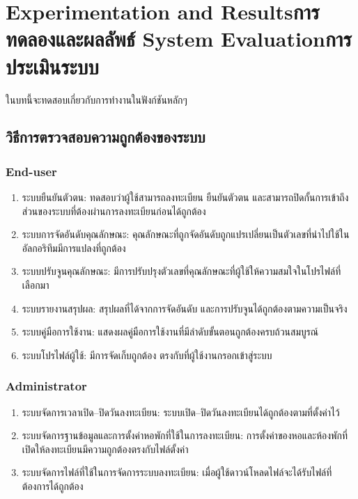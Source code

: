 \chapter{\ifproject%
\ifenglish Experimentation and Results\else การทดลองและผลลัพธ์\fi
\else%
\ifenglish System Evaluation\else การประเมินระบบ\fi
\fi}

ในบทนี้จะทดสอบเกี่ยวกับการทำงานในฟังก์ชันหลักๆ

\section{วิธีการตรวจสอบความถูกต้องของระบบ}
\subsection{End-user}
\begin{enumerate}
    \item ระบบยืนยันตัวตน: ทดสอบว่าผู้ใช้สามารถลงทะเบียน ยืนยันตัวตน และสามารถปิดกั้นการเข้าถึงส่วนของระบบที่ต้องผ่านการลงทะเบียนก่อนได้ถูกต้อง
    \item ระบบการจัดอันดับคุณลักษณะ: คุณลักษณะที่ถูกจัดอันดับถูกแปรเปลี่ยนเป็นตัวเลขที่นำไปใช้ในอัลกอริทึมมีการแปลงที่ถูกต้อง
    \item ระบบปรับจูนคุณลักษณะ: มีการปรับปรุงตัวเลขที่คุณลักษณะที่ผู้ใช้ให้ความสมใจในโปรไฟล์ที่เลือกมา
    \item ระบบรายงานสรุปผล: สรุปผลที่ได้จากการจัดอันดับ และการปรับจูนได้ถูกต้องตามความเป็นจริง
    \item ระบบคู่มือการใช้งาน: แสดงผลคู่มือการใช้งานที่มีลำดับขั้นตอนถูกต้องครบถ้วนสมบูรณ์
    \item ระบบโปรไฟล์ผู้ใช้: มีการจัดเก็บถูกต้อง ตรงกับที่ผู้ใช้งานกรอกเข้าสู่ระบบ
\end{enumerate}

\subsection{Administrator}
\begin{enumerate}
    \item ระบบจัดการเวลาเปิด--ปิดวันลงทะเบียน: ระบบเปิด--ปิดวันลงทะเบียนได้ถูกต้องตามที่ตั้งค่าไว้
    \item ระบบจัดการฐานข้อมูลและการตั้งค่าหอพักที่ใช้ในการลงทะเบียน: การตั้งค่าของหอและห้องพักที่เปิดให้ลงทะเบียนมีความถูกต้องตรงกับไฟล์ตั้งค่า
    \item ระบบจัดการไฟล์ที่ใช้ในการจัดการระบบลงทะเบียน: เมื่อผู้ใช้ดาวน์โหลดไฟล์จะได้รับไฟล์ที่ต้องการได้ถูกต้อง
\end{enumerate}

